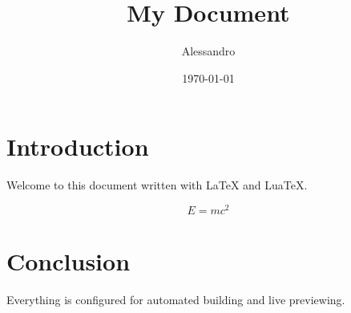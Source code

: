 \documentclass[11pt,a4paper]{article}
\title{My Document}
\author{Alessandro}
\date{\today}
\begin{document}
\maketitle

\section{Introduction}
Welcome to this document written with \LaTeX{} and Lua\TeX{}.

\begin{equation}
    E = mc^2
\end{equation}

\section{Conclusion}
Everything is configured for automated building and live previewing.
\end{document}
